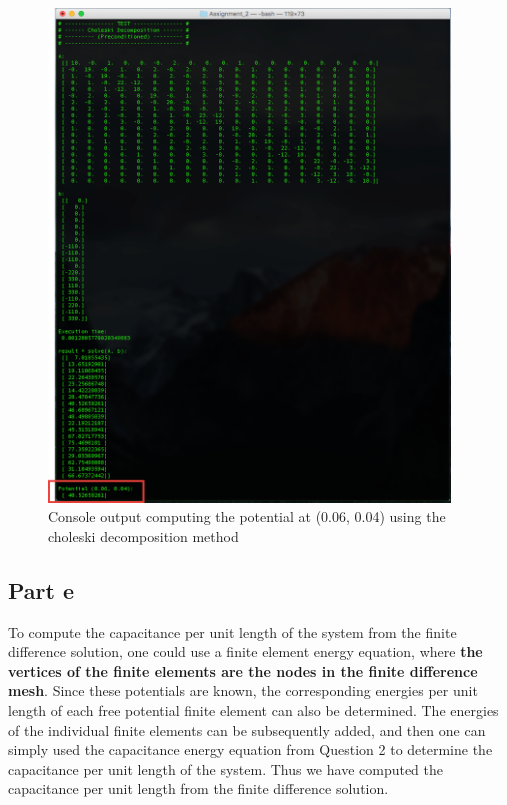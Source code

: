 \documentclass[11pt]{amsart}
\begin{document}
\begin{figure}[h!]
   \includegraphics[width=0.95\textwidth]{assets/chol_potential}
   \caption{Console output computing the potential at (0.06, 0.04) using the choleski decomposition method}
   \label{fig:chol_potential}
\end{figure}
\pagebreak

\subsection*{Part e}
To compute the capacitance per unit length of the system from the finite difference solution, one could use a finite element energy equation, where \textbf{the vertices of the finite elements are the nodes in the finite difference mesh}. Since these potentials are known, the corresponding energies per unit length of each free potential finite element can also be determined. The energies of the individual finite elements can be subsequently added, and then one can simply used the capacitance energy equation from Question 2 to determine the capacitance per unit length of the system. Thus we have computed the capacitance per unit length from the finite difference solution.
\end{document}
